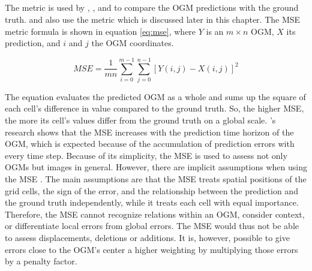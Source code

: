 \subsection{} \label{subsec:mse_met}
The  metric is used by \cite{itkina2019dynamic}, \cite{lange2020attention}, and \cite{toyungyernsub2020double} to compare the \gls{OGM} predictions with the ground truth. \cite{lange2020attention} and \cite{toyungyernsub2020double} also use the  metric which is discussed later in this chapter. The \gls{MSE} metric formula is shown in equation \ref{eq:mse}, where $Y$ is an $m \times n$ \gls{OGM}, $X$ its prediction, and $i$ and $j$ the \gls{OGM} coordinates.

\begin{equation} \label{eq:mse}
	MSE = \frac{1}{mn}\sum_{i=0}^{m-1}\sum_{j=0}^{n-1}[Y(i,j)-X(i,j)]^2
\end{equation}

The equation evaluates the predicted \gls{OGM} as a whole and sums up the square of each cell's difference in value compared to the ground truth. So, the higher \gls{MSE}, the more its cell's values differ from the ground truth on a global scale. \cite{toyungyernsub2020double}'s research shows that the \gls{MSE} increases with the prediction time horizon of the \gls{OGM}, which is expected because of the accumulation of prediction errors with every time step. Because of its simplicity, the \gls{MSE} is used to assess not only \glspl{OGM} but images in general. However, there are implicit assumptions when using the \gls{MSE} \cite{wang2009mean}. The main assumptions are that the \gls{MSE} treats spatial positions of the grid cells, the sign of the error, and the relationship between the prediction and the ground truth independently, while it treats each cell with equal importance. Therefore, the \gls{MSE} cannot recognize relations within an \gls{OGM}, consider context, or differentiate local errors from global errors. The \gls{MSE} would thus not be able to assess displacements, deletions or additions. It is, however, possible to give errors close to the \gls{OGM}'s center a higher weighting by multiplying those errors by a penalty factor.    

